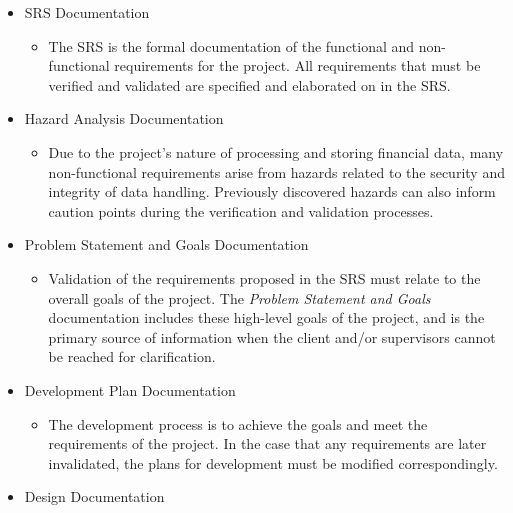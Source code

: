 \documentclass[12pt, titlepage]{article}
\begin{document}

\begin{itemize}
  \item SRS Documentation
    \begin{itemize}
      \item The SRS is the formal documentation of the functional and non-functional requirements for the project.
      All requirements that must be verified and validated are specified and elaborated on in the SRS.
    \end{itemize}
  \item Hazard Analysis Documentation
    \begin{itemize}
      \item Due to the project's nature of processing and storing financial data, many non-functional requirements 
      arise from hazards related to the security and integrity of data handling. Previously discovered hazards can also inform
      caution points during the verification and validation processes.
    \end{itemize}
  \item Problem Statement and Goals Documentation
    \begin{itemize}
      \item Validation of the requirements proposed in the SRS must relate to the overall goals of the project. The \textit{Problem Statement
      and Goals} documentation includes these high-level goals of the project, and is the primary source of information when the client and/or
      supervisors cannot be reached for clarification. 
    \end{itemize}
  \item Development Plan Documentation
    \begin{itemize}
      \item The development process is to achieve the goals and meet the requirements of the project. In the case that any requirements
      are later invalidated, the plans for development must be modified correspondingly. 
    \end{itemize}
  \item Design Documentation

\end{itemize}
\end{document}
